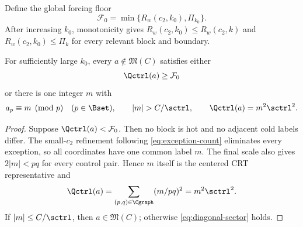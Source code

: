 Define the global forcing floor
\begin{equation}\label{eq:global-floor}
 \mathcal F_0=
 \min\{R_w(c_2,k_0),\Pi_{k_0}\}.
\end{equation}
After increasing $k_0$, monotonicity gives
$R_w(c_2,k_0)\le R_w(c_2,k)$ and
$R_w(c_2,k_0)\le\Pi_k$ for every relevant block and boundary.

\begin{lemma}[Localization]\label{lem:localization}
For sufficiently large $k_0$, every $a\notin\mathfrak M(C)$ satisfies either
\[
 \Qctrl(a)\ge\mathcal F_0
\]
or there is one integer $m$ with
\begin{equation}\label{eq:diagonal-sector}
 a_p\equiv m\pmod p\quad(p\in\Bset),
 \qquad |m|>C/\sctrl,
 \qquad \Qctrl(a)=m^2\sctrl^2.
\end{equation}
\end{lemma}
\begin{proof}
Suppose $\Qctrl(a)<\mathcal F_0$.  Then no block is hot and no adjacent cold
labels differ.  The small-$c_2$ refinement following
\eqref{eq:exception-count} eliminates every exception, so all coordinates
have one common label $m$.  The final scale also gives $2|m|<pq$ for every
control pair.  Hence $m$ itself is the centered CRT representative and
\[
 \Qctrl(a)=\sum_{(p,q)\in\Cgraph}(m/pq)^2=m^2\sctrl^2.
\]
If $|m|\le C/\sctrl$, then $a\in\mathfrak M(C)$; otherwise
\eqref{eq:diagonal-sector} holds.
\end{proof}

